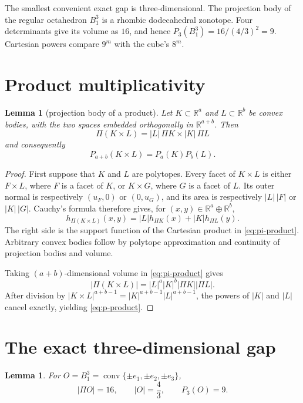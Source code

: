 \documentclass[10pt]{article}
\newtheorem{lemma}[theorem]{Lemma}
\newcommand{\R}{\mathbb R}
\begin{document}
The smallest convenient exact gap is three-dimensional.  The projection
body of the regular octahedron $B_1^3$ is a rhombic dodecahedral zonotope.
Four determinants give its volume as $16$, and hence
$P_3(B_1^3)=16/(4/3)^2=9$.  Cartesian powers compare $9^m$ with the cube's
$8^m$.

\section{Product multiplicativity}

\begin{lemma}[projection body of a product]\label{lem:product}
Let $K\subset\R^a$ and $L\subset\R^b$ be convex bodies, with the two
spaces embedded orthogonally in $\R^{a+b}$.  Then
\begin{equation}\label{eq:pi-product}
 \Pi(K\times L)=|L|\,\Pi K\times |K|\,\Pi L
\end{equation}
and consequently
\begin{equation}\label{eq:p-product}
 P_{a+b}(K\times L)=P_a(K)P_b(L).
\end{equation}
\end{lemma}

\begin{proof}
First suppose that $K$ and $L$ are polytopes.  Every facet of $K\times L$
is either $F\times L$, where $F$ is a facet of $K$, or $K\times G$, where
$G$ is a facet of $L$.  Its outer normal is respectively $(u_F,0)$ or
$(0,u_G)$, and its area is respectively $|L|\,|F|$ or $|K|\,|G|$.
Cauchy's formula therefore gives, for $(x,y)\in\R^a\oplus\R^b$,
\[
 h_{\Pi(K\times L)}(x,y)
 =|L|h_{\Pi K}(x)+|K|h_{\Pi L}(y).
\]
The right side is the support function of the Cartesian product in
\eqref{eq:pi-product}.  Arbitrary convex bodies follow by polytope
approximation and continuity of projection bodies and volume.

Taking $(a+b)$-dimensional volume in \eqref{eq:pi-product} gives
\[
 |\Pi(K\times L)|=|L|^a|K|^b|\Pi K||\Pi L|.
\]
After division by
$|K\times L|^{a+b-1}=|K|^{a+b-1}|L|^{a+b-1}$, the powers of $|K|$ and
$|L|$ cancel exactly, yielding \eqref{eq:p-product}.
\end{proof}

\section{The exact three-dimensional gap}

\begin{lemma}\label{lem:octahedron}
For $O=B_1^3=\operatorname{conv}\{\pm e_1,\pm e_2,\pm e_3\}$,
\[
 |\Pi O|=16,\qquad |O|=\frac43,\qquad P_3(O)=9.
\]
\end{lemma}
\end{document}
